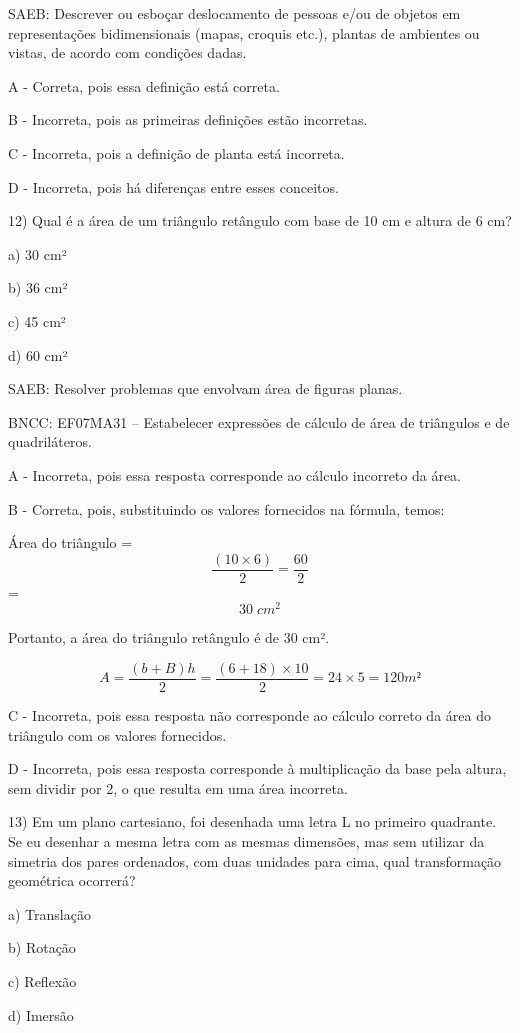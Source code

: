 SAEB: Descrever ou esboçar deslocamento de pessoas e/ou de objetos em
representações bidimensionais (mapas, croquis etc.), plantas de
ambientes ou vistas, de acordo com condições dadas.

A - Correta, pois essa definição está correta.

B - Incorreta, pois as primeiras definições estão incorretas.

C - Incorreta, pois a definição de planta está incorreta.

D - Incorreta, pois há diferenças entre esses conceitos.

12) Qual é a área de um triângulo retângulo com base de 10 cm e altura
de 6 cm?

a) 30 cm²

b) 36 cm²

c) 45 cm²

d) 60 cm²

SAEB: Resolver problemas que envolvam área de figuras planas.

BNCC: EF07MA31 -- Estabelecer expressões de cálculo de área de
triângulos e de quadriláteros.

A - Incorreta, pois essa resposta corresponde ao cálculo incorreto da
área.

B - Correta, pois, substituindo os valores fornecidos na fórmula, temos:

Área do triângulo = \[\frac {(10 \times 6)}{2} = \frac {60}{2}\] =
\[30 \;cm^2\]

Portanto, a área do triângulo retângulo é de 30 cm².

\[A = \frac{\left( b + B \right)h}{2} = \frac{(6 + 18) \times 10}{2} = 24 \times 5 = 120m²\]

C - Incorreta, pois essa resposta não corresponde ao cálculo correto da
área do triângulo com os valores fornecidos.

D - Incorreta, pois essa resposta corresponde à multiplicação da base
pela altura, sem dividir por 2, o que resulta em uma área incorreta.

13) Em um plano cartesiano, foi desenhada uma letra L no primeiro
quadrante. Se eu desenhar a mesma letra com as mesmas dimensões, mas sem
utilizar da simetria dos pares ordenados, com duas unidades para cima,
qual transformação geométrica ocorrerá?

a) Translação

b) Rotação

c) Reflexão

d) Imersão

